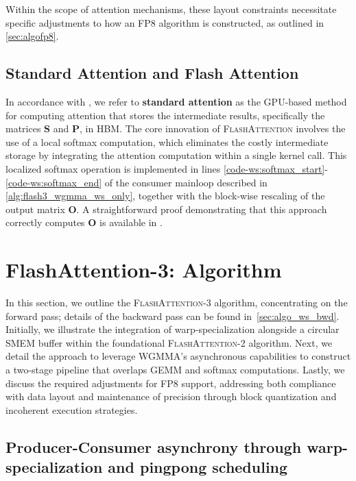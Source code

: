 Within the scope of attention mechanisms, these layout constraints necessitate specific adjustments to how an FP8 algorithm is constructed, as outlined in \cref{sec:algofp8}.

\subsection{Standard Attention and Flash Attention} In accordance with \citet{dao2022flashattention}, we refer to \textbf{standard attention} as the GPU-based method for computing attention that stores the intermediate results, specifically the matrices $\mathbf{S}$ and $\mathbf{P}$, in HBM. The core innovation of \textsc{FlashAttention} involves the use of a local softmax computation, which eliminates the costly intermediate storage by integrating the attention computation within a single kernel call. This localized softmax operation is implemented in lines \ref{code-ws:softmax_start}-\ref{code-ws:softmax_end} of the consumer mainloop described in \cref{alg:flash3_wgmma_ws_only}, together with the block-wise rescaling of the output matrix $\mathbf{O}$. A straightforward proof demonstrating that this approach correctly computes $\mathbf{O}$ is available in \cite[\S 2.3.1]{dao2023flashattention2}.

\section{FlashAttention-3: Algorithm}
\label{sec:algo}

In this section, we outline the \textsc{FlashAttention-3} algorithm, concentrating on the forward pass; details of the backward pass can be found in~\cref{sec:algo_ws_bwd}. Initially, we illustrate the integration of warp-specialization alongside a circular SMEM buffer within the foundational \textsc{FlashAttention-2} algorithm. Next, we detail the approach to leverage WGMMA’s asynchronous capabilities to construct a two-stage pipeline that overlaps GEMM and softmax computations. Lastly, we discuss the required adjustments for FP8 support, addressing both compliance with data layout and maintenance of precision through block quantization and incoherent execution strategies.

\subsection{Producer-Consumer asynchrony through warp-specialization and pingpong scheduling}
\label{sec:algo_ws}

